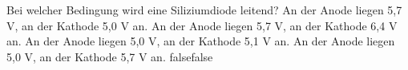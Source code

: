     {Bei welcher Bedingung wird eine Siliziumdiode leitend?}
    {An der Anode liegen 5,7 V, an der Kathode 5,0 V an.}
    {An der Anode liegen 5,7 V, an der Kathode 6,4 V an.}
    {An der Anode liegen 5,0 V, an der Kathode 5,1 V an.}
    {An der Anode liegen 5,0 V, an der Kathode 5,7 V an.}
    {false}{false}